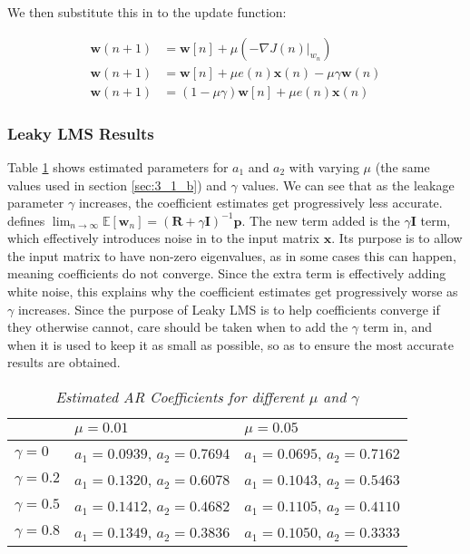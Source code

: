 \documentclass[./main.tex]{subfiles}
\begin{document}
We then substitute this in to the update function:

\begin{subequations}
\begin{align}
\mathbf{w}(n+1) &= \mathbf{w}[n] + \mu (- \nabla J(n)|_{w_n}) \\
\mathbf{w}(n+1) &= \mathbf{w}[n] + \mu e(n) \mathbf{x}(n) - \mu \gamma \mathbf{w}(n) \\
\mathbf{w}(n+1) &= (1 - \mu \gamma ) \mathbf{w}[n] + \mu e(n) \mathbf{x}(n)
\end{align}
\end{subequations}



\subsubsection{Leaky LMS Results}

Table \ref{tab:3_1_f} shows estimated parameters for $a_1$ and $a_2$ with varying $\mu$ (the same values used in section \ref{sec:3_1_b}) and $\gamma$ values. We can see that as the leakage parameter $\gamma$ increases, the coefficient estimates get progressively less accurate. \cite{Kamenetsky2004} defines $ \lim_{n \to \infty } \mathbb{E}[\mathbf{w}_n] = (\mathbf{R} + \gamma \mathbf{I})^{-1} \mathbf{p} $. The new term added is the $\gamma \mathbf{I} $ term, which effectively introduces noise in to the input matrix $ \mathbf{x} $. Its purpose is to allow the input matrix to have non-zero eigenvalues, as in some cases this can happen, meaning coefficients do not converge. Since the extra term is effectively adding white noise, this explains why the coefficient estimates get progressively worse as $ \gamma $ increases. Since the purpose of Leaky LMS is to help coefficients converge if they otherwise cannot, care should be taken when to add the $ \gamma $ term in, and when it is used to keep it as small as possible, so as to ensure the most accurate results are obtained.

\begin{table}[h]
\centering
\begin{tabular}{|l|l|l|}
\hline
               & $\mu = 0.01 $                  & $\mu = 0.05 $                  \\ \hline
$\gamma = 0$   & $a_1 = 0.0939$, $a_2 = 0.7694$ & $a_1 = 0.0695$, $a_2 = 0.7162$ \\ \hline
$\gamma = 0.2$ & $a_1 = 0.1320$, $a_2 = 0.6078$ & $a_1 = 0.1043$, $a_2 = 0.5463$ \\ \hline
$\gamma = 0.5$ & $a_1 = 0.1412$, $a_2 = 0.4682$ & $a_1 = 0.1105$, $a_2 = 0.4110$ \\ \hline
$\gamma = 0.8$ & $a_1 = 0.1349$, $a_2 = 0.3836$ & $a_1 = 0.1050$, $a_2 = 0.3333$ \\ \hline
\end{tabular}
\caption{\textit{Estimated AR Coefficients for different $\mu$ and $\gamma$}}
\label{tab:3_1_f}
\end{table}
\end{document}
